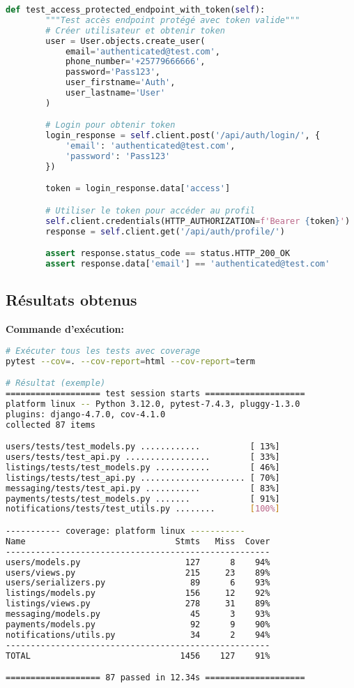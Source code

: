 \begin{lstlisting}[language=Python, caption=users/tests/test\_api.py]
    def test_access_protected_endpoint_with_token(self):
        """Test accès endpoint protégé avec token valide"""
        # Créer utilisateur et obtenir token
        user = User.objects.create_user(
            email='authenticated@test.com',
            phone_number='+25779666666',
            password='Pass123',
            user_firstname='Auth',
            user_lastname='User'
        )

        # Login pour obtenir token
        login_response = self.client.post('/api/auth/login/', {
            'email': 'authenticated@test.com',
            'password': 'Pass123'
        })

        token = login_response.data['access']

        # Utiliser le token pour accéder au profil
        self.client.credentials(HTTP_AUTHORIZATION=f'Bearer {token}')
        response = self.client.get('/api/auth/profile/')

        assert response.status_code == status.HTTP_200_OK
        assert response.data['email'] == 'authenticated@test.com'
\end{lstlisting}

\subsection{Résultats obtenus}

\textbf{Commande d'exécution:}
\begin{lstlisting}[language=bash]
# Exécuter tous les tests avec coverage
pytest --cov=. --cov-report=html --cov-report=term

# Résultat (exemple)
=================== test session starts ====================
platform linux -- Python 3.12.0, pytest-7.4.3, pluggy-1.3.0
plugins: django-4.7.0, cov-4.1.0
collected 87 items

users/tests/test_models.py ............          [ 13%]
users/tests/test_api.py .................        [ 33%]
listings/tests/test_models.py ...........        [ 46%]
listings/tests/test_api.py ..................... [ 70%]
messaging/tests/test_api.py ...........          [ 83%]
payments/tests/test_models.py .......            [ 91%]
notifications/tests/test_utils.py ........       [100%]

----------- coverage: platform linux -----------
Name                              Stmts   Miss  Cover
-----------------------------------------------------
users/models.py                     127      8    94%
users/views.py                      215     23    89%
users/serializers.py                 89      6    93%
listings/models.py                  156     12    92%
listings/views.py                   278     31    89%
messaging/models.py                  45      3    93%
payments/models.py                   92      9    90%
notifications/utils.py               34      2    94%
-----------------------------------------------------
TOTAL                              1456    127    91%

=================== 87 passed in 12.34s ====================
\end{lstlisting}

